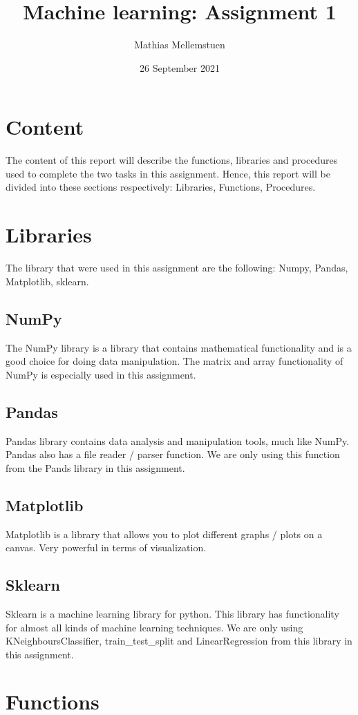 \documentclass[titlepage, 11pt]{article}
\title{Machine learning: Assignment 1}
\author{Mathias Mellemstuen}
\date{26 September 2021}
\begin{document}
    \maketitle
    
    \section{Content}
    The content of this report will describe the functions, libraries and procedures used to complete the two tasks in this assignment. Hence, this report will be divided into these sections respectively: Libraries, Functions, Procedures.
	\section{Libraries}
	
	The library that were used in this assignment are the following: Numpy, Pandas, Matplotlib, sklearn.

	\subsection{NumPy}
	The NumPy library is a library that contains mathematical functionality and is a good choice for doing data manipulation. The matrix and array functionality of NumPy is especially used in this assignment.  
	\subsection{Pandas}
	Pandas library contains data analysis and manipulation tools, much like NumPy. Pandas also has a file reader / parser function. We are only using this function from the Pands library in this assignment.
	\subsection{Matplotlib}
	Matplotlib is a library that allows you to plot different graphs / plots on a canvas. Very powerful in terms of visualization. 
	\subsection{Sklearn}
	Sklearn is a machine learning library for python. This library has functionality for almost all kinds of machine learning techniques. We are only using KNeighboursClassifier, train\_test\_split and LinearRegression from this library in this assignment.
	
	\section{Functions}
	
\end{document}
